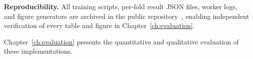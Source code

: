 \textbf{Reproducibility.}
All training scripts, per-fold result JSON files, worker logs, and
figure generators are archived in the public
repository~\cite{lchai_repo}, enabling independent verification of
every table and figure in Chapter~\ref{ch:evaluation}.

Chapter~\ref{ch:evaluation} presents the quantitative and qualitative
evaluation of these implementations.

